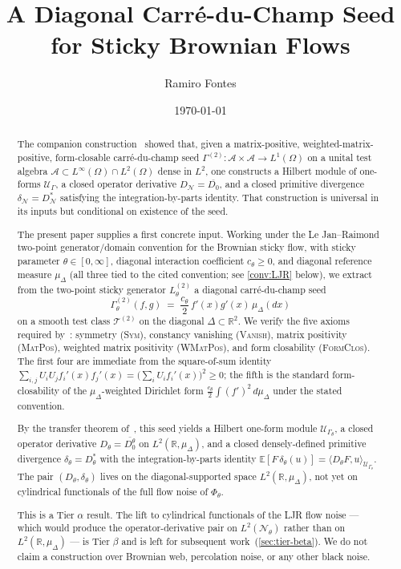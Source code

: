 \documentclass[11pt,reqno]{amsart}
\title{A Diagonal Carr\'e-du-Champ Seed\\
       for Sticky Brownian Flows}
\author{Ramiro Fontes}
\date{\today}
\theoremstyle{plain}
\theoremstyle{definition}
\theoremstyle{remark}
\newcommand{\R}{\mathbb{R}}
\newcommand{\E}{\mathbb{E}}
\newcommand{\cA}{\mathcal A}
\newcommand{\cN}{\mathcal N}
\newcommand{\cT}{\mathcal T}
\newcommand{\cU}{\mathcal U}
\newcommand{\Dth}{D_{\theta}}
\newcommand{\divth}{\delta_{\theta}}
\begin{document}
\begin{abstract}
The companion construction~\cite{GammaHierarchyDivergence}
showed that, given a matrix-positive, weighted-matrix-positive,
form-closable carr\'e-du-champ seed
$\Gamma^{(2)}\colon\cA\times\cA\to L^{1}(\Omega)$ on a unital
test algebra $\cA\subset L^{\infty}(\Omega)\cap L^{2}(\Omega)$
dense in $L^{2}$, one constructs a Hilbert module of one-forms
$\cU_{\Gamma}$, a closed operator derivative
$D_{\cN}=\overline{D_{0}}$, and a closed primitive divergence
$\delta_{\cN}=D_{\cN}^{*}$ satisfying the integration-by-parts
identity. That construction is universal in its inputs but
conditional on existence of the seed.

The present paper supplies a first concrete input. Working under
the Le Jan--Raimond two-point generator/domain convention for the
Brownian sticky flow, with sticky parameter $\theta\in[0,\infty]$,
diagonal interaction coefficient $c_{\theta}\ge 0$, and diagonal
reference measure $\mu_{\Delta}$ (all three tied to the cited
convention; see \cref{conv:LJR} below), we extract from the
two-point sticky generator $L^{(2)}_{\theta}$ a diagonal
carr\'e-du-champ seed
\[
  \Gamma^{(2)}_{\theta}(f,g)
  \;=\;\frac{c_{\theta}}{2}\,f'(x)g'(x)\,\mu_{\Delta}(dx)
\]
on a smooth test class $\cT^{(2)}$ on the diagonal
$\Delta\subset\R^{2}$. We verify the five axioms required
by~\cite{GammaHierarchyDivergence}: symmetry \textsc{(Sym)},
constancy vanishing \textsc{(Vanish)}, matrix positivity
\textsc{(MatPos)}, weighted matrix positivity \textsc{(WMatPos)},
and form closability \textsc{(FormClos)}. The first four are
immediate from the square-of-sum identity
$\sum_{i,j}U_{i}U_{j}f_{i}'(x)f_{j}'(x)=\bigl(\sum_{i}U_{i}f_{i}'(x)\bigr)^{2}\ge 0$;
the fifth is the standard form-closability of the
$\mu_{\Delta}$-weighted Dirichlet form $\frac{c_{\theta}}{2}\int(f')^{2}\,d\mu_{\Delta}$
under the stated convention.

By the transfer theorem of~\cite{GammaHierarchyDivergence}, this
seed yields a Hilbert one-form module $\cU_{\Gamma_{\theta}}$, a
closed operator derivative $\Dth=\overline{D_{0}^{\theta}}$ on
$L^{2}(\R,\mu_{\Delta})$, and a closed densely-defined primitive
divergence $\divth=\Dth^{*}$ with the integration-by-parts
identity
$\E[F\,\divth(u)]=\langle\Dth F,u\rangle_{\cU_{\Gamma_{\theta}}}$.
The pair $(\Dth,\divth)$ lives on the diagonal-supported space
$L^{2}(\R,\mu_{\Delta})$, not yet on cylindrical functionals of
the full flow noise of $\Phi_{\theta}$.

This is a Tier $\alpha$ result. The lift to cylindrical
functionals of the LJR flow noise --- which would produce the
operator-derivative pair on $L^{2}(\cN_{\theta})$ rather than on
$L^{2}(\R,\mu_{\Delta})$ --- is Tier $\beta$ and is left for
subsequent work~(\cref{sec:tier-beta}). We do not claim a
construction over Brownian web, percolation noise, or any other
black noise.
\end{abstract}
\end{document}
